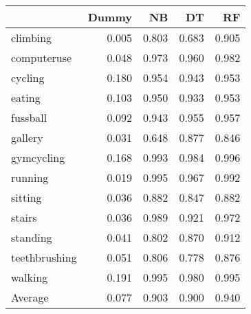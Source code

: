 \begin{tabular}{lrrrr}
\toprule
{} &  Dummy &    NB &    DT &    RF \\
\midrule
climbing      &  0.005 & 0.803 & 0.683 & 0.905 \\
computeruse   &  0.048 & 0.973 & 0.960 & 0.982 \\
cycling       &  0.180 & 0.954 & 0.943 & 0.953 \\
eating        &  0.103 & 0.950 & 0.933 & 0.953 \\
fussball      &  0.092 & 0.943 & 0.955 & 0.957 \\
gallery       &  0.031 & 0.648 & 0.877 & 0.846 \\
gymcycling    &  0.168 & 0.993 & 0.984 & 0.996 \\
running       &  0.019 & 0.995 & 0.967 & 0.992 \\
sitting       &  0.036 & 0.882 & 0.847 & 0.882 \\
stairs        &  0.036 & 0.989 & 0.921 & 0.972 \\
standing      &  0.041 & 0.802 & 0.870 & 0.912 \\
teethbrushing &  0.051 & 0.806 & 0.778 & 0.876 \\
walking       &  0.191 & 0.995 & 0.980 & 0.995 \\
Average       &  0.077 & 0.903 & 0.900 & 0.940 \\
\bottomrule
\end{tabular}
